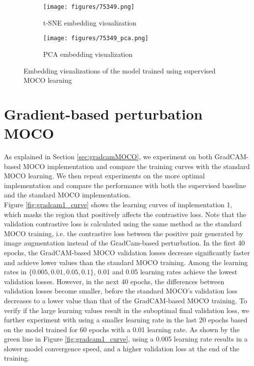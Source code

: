 \documentclass[12pt,twoside]{report}
\begin{document}
\begin{figure}
\centering
    \begin{subfigure}{.45\textwidth}
      \centering
      \texttt{[image: figures/75349.png]}
      \caption{t-SNE embedding visualization}
      \label{fig:supervisedMOCO_tsne}
    \end{subfigure}%
    \begin{subfigure}{.45\textwidth}
      \centering
      \texttt{[image: figures/75349\_pca.png]}
      \caption{PCA embedding visualization}
      \label{fig:supervisedMOCO_pca}
    \end{subfigure}
    \caption{Embedding visualizations of the model trained using supervised MOCO learning}
    \label{fig:supervisedMOCO_embedding}
\end{figure}

\section{Gradient-based perturbation MOCO} \label{sec:gradientMOCO_eval}
As explained in Section \ref{sec:gradcamMOCO}, we experiment on both GradCAM-based MOCO implementation and compare the training curves with the standard MOCO learning. We then repeat experiments on the more optimal implementation and compare the performance with both the supervised baseline and the standard MOCO implementation.\\ 

Figure \ref{fig:gradcam1_curve} shows the learning curves of implementation 1, which masks the region that positively affects the contrastive loss. Note that the validation contrastive loss is calculated using the same method as the standard MOCO training, i.e. the contrastive loss between the positive pair generated by image augmentation instead of the GradCam-based perturbation. In the first 40 epochs, the GradCAM-based MOCO validation losses decrease significantly faster and achieve lower values than the standard MOCO training. Among the learning rates in $\{0.005, 0.01, 0.05, 0.1\}$, 0.01 and 0.05 learning rates achieve the lowest validation losses. However, in the next 40 epochs, the differences between validation losses become smaller, before the standard MOCO's validation loss decreases to a lower value than that of the GradCAM-based MOCO training. To verify if the large learning values result in the suboptimal final validation loss, we further experiment with using a smaller learning rate in the last 20 epochs based on the model trained for 60 epochs with a 0.01 learning rate. As shown by the green line in Figure \ref{fig:gradcam1_curve}, using a 0.005 learning rate results in a slower model convergence speed, and a higher validation loss at the end of the training. \\
\end{document}
